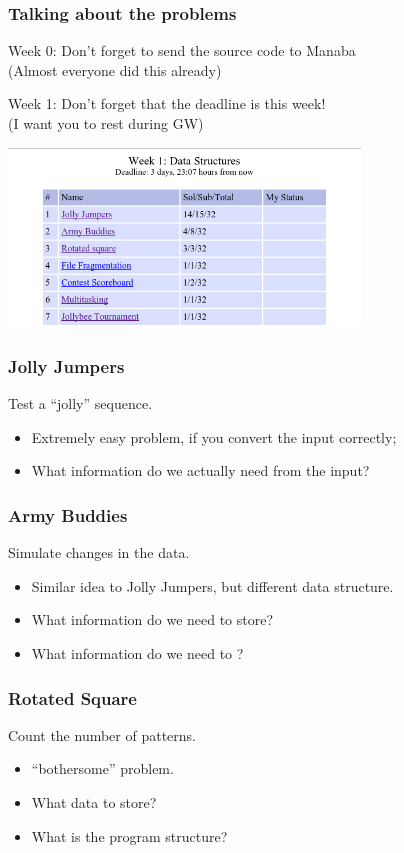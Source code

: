 \documentclass{beamer}
\begin{document}
\begin{frame}
  \frametitle{Talking about the problems}
  {\smaller
  \alert{Week 0}: Don't forget to send the source code to Manaba\\
  (Almost everyone did this already)

  \smallskip
  
  \alert{Week 1}: Don't forget that the deadline is this week!\\
  (I want you to rest during GW)
  }
  \medskip

  \begin{center}
    \includegraphics[width=0.7\textwidth]{../img/week1results2016}
  \end{center}
\end{frame}

\begin{frame}
  \frametitle{Jolly Jumpers}
  Test a ``jolly'' sequence.
  \begin{itemize}
  \item Extremely easy problem, if you convert the input correctly;
  \item What information do we actually need from the input?
  \end{itemize}
\end{frame}

\begin{frame}
  \frametitle{Army Buddies}
  Simulate changes in the data.
  \begin{itemize}
  \item Similar idea to Jolly Jumpers, but different data structure.
  \item What information do we need to store?
  \item What information do we need to ?
  \end{itemize}
\end{frame}

\begin{frame}
  \frametitle{Rotated Square}
  Count the number of patterns.
  \begin{itemize}
  \item ``bothersome'' problem.
  \item What data to store?
  \item What is the program structure?
  \end{itemize}
\end{frame}
\end{document}
